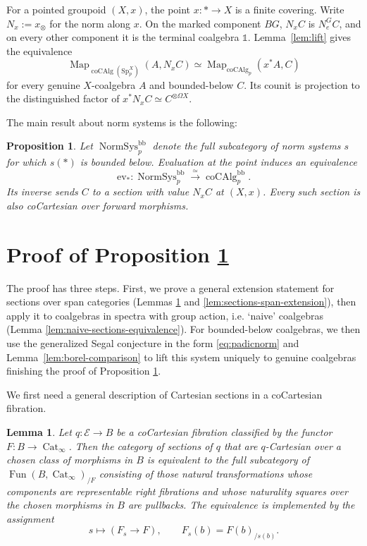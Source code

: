 \documentclass[11pt,a4paper]{article}
\newcommand{\mathbbm}[1]{\mathds{#1}}
\newtheorem{prop}[thm]{Proposition}
\newtheorem{lemma}[thm]{Lemma}
\theoremstyle{definition}
\newcommand{\Sp}{\mathrm{Sp}}
\newcommand{\coAlg}{\operatorname{coCAlg}}
\newcommand{\NormSys}{\operatorname{NormSys}}
\newcommand{\Map}{\operatorname{Map}}
\newcommand{\Fun}{\operatorname{Fun}}
\begin{document}
For a pointed groupoid $(X,x)$, the point $x:*\to X$ is a finite
covering. Write $N_x:=x_\otimes$ for the norm along $x$.
On the marked component $BG$, $N_xC$ is $N_e^GC$,
and on every other component it is the terminal
coalgebra $\mathbbm{1}$. Lemma~\ref{lem:lift} gives the equivalence
\begin{equation}\label{eq:point-adjunction}
 \Map_{\coAlg(\Sp_p^X)}(A,N_xC)
 \simeq \Map_{\coAlg_p}(x^*A,C)
\end{equation}
for every genuine $X$-coalgebra $A$ and bounded-below $C$.
Its counit is projection to the distinguished factor of
$x^*N_xC\simeq C^{\otimes\Omega X}$. 

The main result about norm systems is the following:

\begin{prop}\label{prop:sections-equivalence}
Let $\NormSys_p^{\mathrm{bb}}$ denote the full
subcategory of norm systems $s$ for which $s(*)$ is bounded
below. Evaluation at the point induces an equivalence
\[
 \mathrm{ev}_*:\NormSys_p^{\mathrm{bb}}
 \xrightarrow{\simeq}\coAlg_p^{\mathrm{bb}}.
\]
Its inverse sends $C$ to a section with value $N_xC$ at $(X,x)$.
Every such section is also coCartesian over forward morphisms.
\end{prop}


\section{Proof of Proposition \ref{prop:sections-equivalence}}\label{sec:proofnormsystem}

The proof has three steps. First, we prove a general extension statement
for sections over span categories (Lemmas \ref{lem:sections-yoneda} and \ref{lem:sections-span-extension}), then apply it to coalgebras in spectra
with group action, i.e. `naive' coalgebras (Lemma \ref{lem:naive-sections-equivalence}). For bounded-below coalgebras, we then use the
generalized Segal conjecture in the form \eqref{eq:padicnorm} and
Lemma~\ref{lem:borel-comparison} to lift this system uniquely to
genuine coalgebras finishing the proof of Proposition \ref{prop:sections-equivalence}.

We first need a general description of Cartesian sections in a coCartesian fibration. 

\begin{lemma}\label{lem:sections-yoneda}
Let $q:\mathcal E\to B$ be a coCartesian fibration classified by the functor 
$F:B\to\operatorname{Cat}_\infty$. Then the category of sections of $q$ that  are $q$-Cartesian over a chosen
class of morphisms in $B$ is equivalent to  the full subcategory of
$\Fun(B,\operatorname{Cat}_\infty)_{/F}$ consisting of those natural transformations  whose components  are representable right fibrations
and whose naturality squares over the chosen morphisms in $B$ are pullbacks.
The equivalence is implemented by the assignment 
\[
 s\longmapsto(F_s\to F),\qquad F_s(b)=F(b)_{/s(b)}.
\]
\end{lemma}
\end{document}

